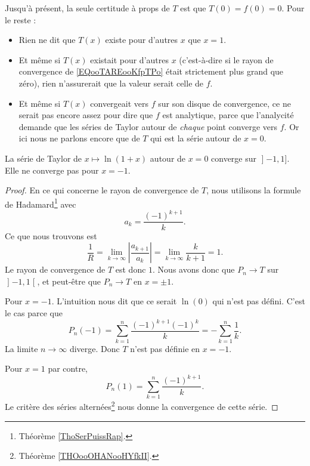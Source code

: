 	Jusqu'à présent, la seule certitude à props de \( T\) est que \( T(0)=f(0)=0\). Pour le reste :
	\begin{itemize}
		\item Rien ne dit que \( T(x)\) existe pour d'autres \( x\) que \( x=1\).
		\item Et même si \( T(x)\) existait pour d'autres \( x\) (c'est-à-dire si le rayon de convergence de \eqref{EQooTAREooKfpTPo} était strictement plus grand que zéro), rien n'assurerait que la valeur serait celle de \( f\).
		\item Et même si \( T(x)\) convergeait vers \( f\) sur son disque de convergence, ce ne serait pas encore assez pour dire que \( f\) est analytique, parce que l'analycité demande que les séries de Taylor autour de \emph{chaque} point converge vers \( f\). Or ici nous ne parlons encore que de \( T\) qui est la série autour de \( x=0\).
	\end{itemize}

	\begin{lemma}       \label{LEMooWMGGooRpAxBa}
		La série de Taylor de \( x\mapsto \ln(1+x)\) autour de \( x=0\) converge sur \( \mathopen] -1 , 1 \mathclose]\). Elle ne converge pas pour \( x=-1\).
	\end{lemma}

	\begin{proof}

		En ce qui concerne le rayon de convergence de \( T\), nous utilisons la formule de Hadamard\footnote{Théorème \ref{ThoSerPuissRap}.} avec
		\begin{equation}
			a_k=\frac{ (-1)^{k+1} }{ k }.
		\end{equation}
		Ce que nous trouvons est
		\begin{equation}
			\frac{1}{ R }=\lim_{k\to \infty} | \frac{ a_{k+1} }{ a_k } |=\lim_{k\to \infty} \frac{ k }{ k+1 }=1.
		\end{equation}
		Le rayon de convergence de \( T\) est donc \( 1\). Nous avons donc que \( P_n\to T\) sur \( \mathopen] -1 , 1 \mathclose[\), et peut-être que \( P_n\to T\) en \( x=\pm 1\).

		Pour \( x=-1\). L'intuition nous dit que ce serait \( \ln(0)\) qui n'est pas défini. C'est le cas parce que
		\begin{equation}
			P_n(-1)=\sum_{k=1}^n\frac{ (-1)^{k+1}(-1)^k }{ k }=-\sum_{k=1}^n\frac{1}{ k }.
		\end{equation}
		La limite \( n\to \infty\) diverge. Donc \( T\) n'est pas définie en \( x=-1\).

		Pour \( x=1\) par contre,
		\begin{equation}
			P_n(1)=\sum_{k=1}^n\frac{ (-1)^{k+1} }{ k }.
		\end{equation}
		Le critère des séries alternées\footnote{Théorème \ref{THOooOHANooHYfkII}.} nous donne la convergence de cette série.
	\end{proof}

